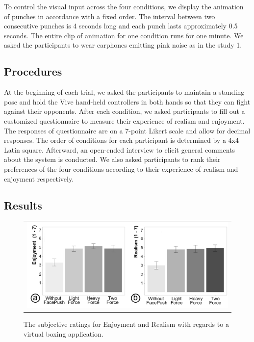 To control the visual input across the four conditions, we display the animation of punches in accordance with a fixed order. The interval between two consecutive punches is 4 seconds long and each punch lasts approximately 0.5 seconds. The entire clip of animation for one condition runs for one minute. We asked the participants to wear earphones emitting pink noise as in the study 1.

\subsection{Procedures }
At the beginning of each trial, we asked the participants to maintain a standing pose and hold the Vive hand-held controllers in both hands so that they can fight against their opponents. After each condition, we asked participants to fill out a customized questionnaire to measure their experience of realism and enjoyment. The responses of questionnaire are on a 7-point Likert scale and allow for decimal responses. The order of conditions for each participant is determined by a 4x4 Latin square. Afterward, an open-ended interview to elicit general comments about the system is conducted. We also asked participants to rank their preferences of the four conditions according to their experience of realism and enjoyment respectively.

\subsection{Results }

\begin{figure}[h]
    \begin{center}
        \begin{tabular}{@{\hspace{0.1cm}}c}
        \includegraphics[width=1\linewidth]{figures/enjoymentrealism.png}
        \end{tabular}
        \caption{The subjective ratings for Enjoyment and Realism with regards to a virtual boxing application.}
        \label{fig:enjoymentrealism}
    \end{center}
\end{figure}

